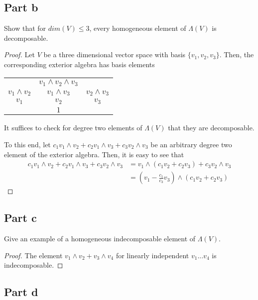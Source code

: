 \documentclass[paper=a4, fontsize=11pt]{scrartcl} %
\numberwithin{equation}{section} %
\numberwithin{figure}{section} %
\numberwithin{table}{section} %
\begin{document}
\subsection{Part b}

Show that for $dim(V) \leq 3$, every homogeneous element of $\Lambda (V)$ is decomposable.

\begin{proof}

Let $V$ be a three dimensional vector space with basis $\{v_1, v_2, v_3\}$.
Then, the corresponding exterior algebra has basis elements
\\
\begin{center}
\begin{tabular}{c c c}
                & $v_1 \wedge v_2 \wedge v_3$ &\\
$v_1 \wedge v_2$  & $v_1 \wedge v_3$  & $v_2 \wedge v_3$\\
$v_1$             & $v_2$               & $v_3$\\
                  & $1$ &
\end{tabular}
\end{center}

It suffices to check for degree two elements of $\Lambda(V)$ that they are decomposable.

To this end, let $c_1 v_1 \wedge v_2 + c_2 v_1 \wedge v_3 + c_3 v_2 \wedge v_3$ be an arbitrary
degree two element of the exterior algebra.
Then, it is easy to see that 
\[
\begin{aligned}
c_1 v_1 \wedge v_2 + c_2 v_1 \wedge v_3 + c_3 v_2 \wedge v_3 & = v_1 \wedge (c_1 v_2 + c_2 v_3) + c_3 v_2 \wedge v_3\\
& = (v_1 -\frac{c_1}{c_3}v_3) \wedge (c_1v_2 + c_2v_3)
\end{aligned}
\]

\end{proof}

\subsection{Part c}

Give an example of a homogeneous indecomposable element of $\Lambda(V)$.

\begin{proof}
The element $v_1 \wedge v_2 + v_3 \wedge v_4$ for linearly independent $v_1...v_4$ is indecomposable.
\end{proof}

\subsection{Part d}
\end{document}
